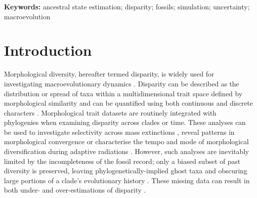 \documentclass[11pt, a4paper]{article}
\begin{document}
\noindent\textbf{Keywords:} ancestral state estimation; disparity; fossils; simulation; uncertainty; macroevolution

\section{Introduction}

Morphological diversity, hereafter termed disparity, is widely used for investigating macroevolutionary dynamics \citep{foote1997evolution,wills2001morphological,guillerme2020disparities}.
Disparity can be described as the distribution or spread of taxa within a multidimensional trait space defined by morphological similarity \citep{erwin_disparity_2007} and can be quantified using both continuous \citep{garcia2017phenotypic,gray2019exceptional, friedman2020body} and discrete characters \citep{foote1994morphological, lloyd2016estimating}.
Morphological trait datasets are routinely integrated with phylogenies when examining disparity across clades or time.
These analyses can be used to investigate selectivity across mass extinctions \citep{bapst2012graptoloid,cole2021selectivity, liu2024heterogeneous}, reveal patterns in morphological convergence \citep{muschick2012convergent,stayton2015definition,stayton2024does} or characterise the tempo and mode of morphological diversification during adaptive radiations \citep{harmon2003tempo,losos2010adaptive, hughes2013clades}.
However, such analyses are inevitably limited by the incompleteness of the fossil record; only a biased subset of past diversity is preserved, leaving phylogenetically-implied ghost taxa %
 and obscuring large portions of a clade's evolutionary history \citep{norell1993tree, wagner1995stratigraphic,flannery2019does,smith2021phylogenetic}.
These missing data can result in both under- and over-estimations of disparity \citep{mitchell2015extant,smith2023fossilization}.
\end{document}
